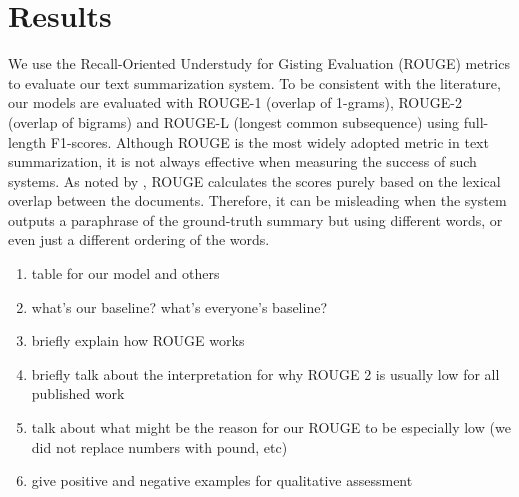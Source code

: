 \section{Results}
\label{sec: result}

We use the Recall-Oriented Understudy for Gisting Evaluation (ROUGE) metrics \cite{lin2004rouge} to evaluate our text summarization system. To be consistent with the literature, our models are evaluated with ROUGE-1 (overlap of 1-grams), ROUGE-2 (overlap of bigrams) and ROUGE-L (longest common subsequence) using full-length F1-scores. Although ROUGE is the most widely adopted metric in text summarization, it is not always effective when measuring the success of such systems. As noted by \cite{cohan2016revisiting}, ROUGE calculates the scores purely based on the lexical overlap between the documents. Therefore, it can be misleading when the system outputs a paraphrase of the ground-truth summary but using different words, or even just a different ordering of the words.


\begin{enumerate}
\item table for our model and others
\item what's our baseline? what's everyone's baseline?
\item briefly explain how ROUGE works
\item briefly talk about the interpretation for why ROUGE 2 is usually low for all published work
\item talk about what might be the reason for our ROUGE to be especially low (we did not replace numbers with pound, etc)
\item give positive and negative examples for qualitative assessment
\end{enumerate}